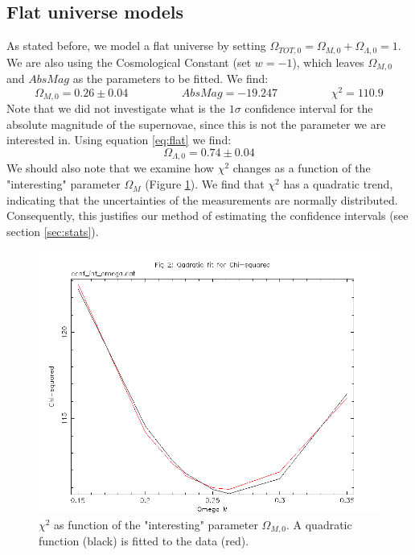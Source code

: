 \documentclass[11pt]{article}
\begin{document}
\subsection{Flat universe models} \label{sec:flat}
As stated before, we model a flat universe by setting $\Omega_{TOT,0} = \Omega_{M,0} + \Omega_{\Lambda,0} = 1$. We are also using the Cosmological Constant (set $w = -1$), which leaves  $\Omega_{M,0}$ and $AbsMag$ as the parameters to be fitted. We find: 
\begin{equation}
	\Omega_{M,0} = 0.26 \pm 0.04
	\hspace{2cm}
	AbsMag = -19.247
	\hspace{2cm}
	\chi^2 = 110.9
	\label{res:flatM}
\end{equation}
Note that we did not investigate what is the $1\sigma$ confidence interval for the absolute magnitude of the supernovae, since this is not the parameter we are interested in. Using equation \eqref{eq:flat} we find: 
\begin{equation}
	\Omega_{\Lambda,0} = 0.74 \pm 0.04
	\label{res:flatL}
\end{equation}
We should also note that we examine how $\chi^2$ changes as a function of the "interesting" parameter $\Omega_M$ (Figure \ref{fig:quad}). We find that $\chi^2$ has a quadratic trend, indicating that the uncertainties of the measurements are normally distributed. Consequently, this justifies our method of estimating the confidence intervals (see section \ref{sec:stats}).
\begin{figure}[htbp]
	\centering
	\includegraphics[width=0.8\linewidth]{quad.png}
	\caption{$\chi^2$ as function of the "interesting" parameter $\Omega_{M,0}$. A quadratic function (black) is fitted to the data (red).}
	\label{fig:quad}
\end{figure}
\end{document}
